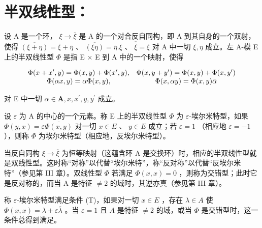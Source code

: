 \section*{半双线性型：}

设 A 是一个环， \(\xi \to \overline{\xi}\) 是 A 的一个对合反自同构，即 A 到其自身的一个双射，使得 \(\overline{(\xi + \eta)} = \overline{\xi} + \overline{\eta}\) 、 \(\overline{(\xi\eta)} = \overline{\eta} . \overline{\xi}\) 、 \(\overline{\overline{\xi}} = \xi\) 对 A 中一切 \(\xi, \eta\) 成立。左 A-模 E 上的半双线性型 \(\Phi\) 是指 E × E 到 A 中的一个映射，使得

\[
\begin{array}{c c} \Phi (x + x ^ {\prime}, y) = \Phi (x, y) + \Phi (x ^ {\prime}, y), & \Phi (x, y + y ^ {\prime}) = \Phi (x, y) + \Phi (x, y ^ {\prime}) \\ \Phi (\alpha x, y) = \alpha \Phi (x, y), & \Phi (x, \alpha y) = \Phi (x, y) \bar {\alpha} \end{array}
\]

对 E 中一切 \(\alpha\in\mathbf{A},x,x^{\prime},y,y^{\prime}\) 成立。

设 \(\varepsilon\) 为 A 的中心的一个元素。称 E 上的半双线性型 \(\Phi\) 为 \(\varepsilon\)-埃尔米特型，如果 \(\Phi(y, x) = \varepsilon \overline{\Phi(x, y)}\) 对一切 \(x \in E\) 、 \(y \in E\) 成立；若 \(\varepsilon = 1\) （相应地 \(\varepsilon = -1\) ），则称 \(\Phi\) 为埃尔米特型（相应地，反埃尔米特型）。

当反自同构 \(\xi\to\overline{\xi}\) 为恒等映射（这蕴含环 A 是交换环）时，相应的半双线性型就是双线性型。这时称“对称”以代替“埃尔米特”，称“反对称”以代替“反埃尔米特”（参见第 III 章）。双线性型 \(\Phi\) 若满足 \(\Phi(x,x)=0\) ，则称为交错型；此时它是反对称的，而当 A 是特征 \(\neq2\) 的域时，其逆亦真（参见第 III 章）。

称 \(\varepsilon\)-埃尔米特型满足条件 (T)，如果对一切 \(x \in E\) ，存在 \(\lambda \in A\) 使 \(\Phi(x, x) = \lambda + \varepsilon \overline{\lambda}\) 。当 \(\varepsilon = 1\) 且 \(A\) 是特征 \(\neq 2\) 的域，或当 \(\Phi\) 是交错型时，这一条件总得到满足。


